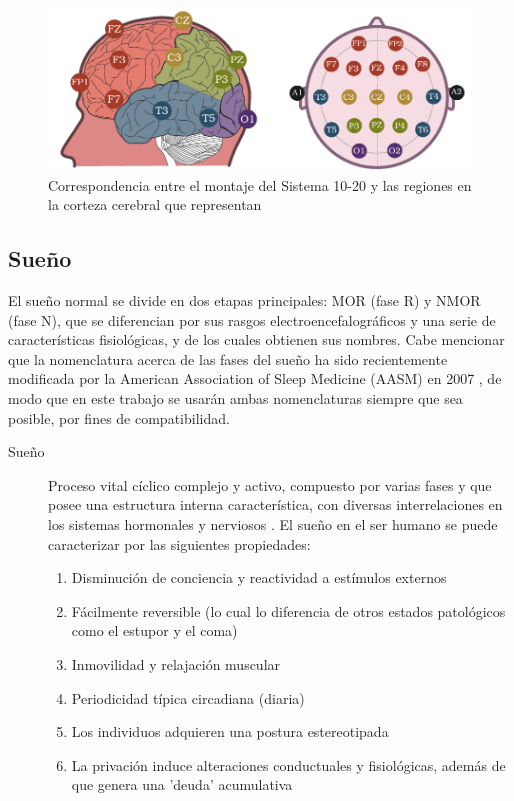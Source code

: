 \begin{figure}
\centering
\includegraphics[width=\linewidth]{./img_diagramas/cerebro_1020_v2.pdf} 
\caption{Correspondencia entre el montaje del Sistema 10-20 y las regiones en la corteza cerebral 
que representan
}
\label{corresponde_1020}
\end{figure}


\subsection{Sueño}

El sue\~no normal se divide en dos etapas principales: MOR (fase R) y NMOR (fase N), que se 
diferencian por sus rasgos electroencefalogr\'aficos y una serie de caracter\'isticas 
fisiol\'ogicas, y de los cuales obtienen sus nombres.
Cabe mencionar que la nomenclatura acerca de las fases del sue\~no ha sido recientemente modificada 
por la American Association of Sleep Medicine (AASM) en 2007 \cite{AASM07}, de modo que en este 
trabajo se  usar\'an ambas nomenclaturas siempre que sea posible, por fines de compatibilidad.

\begin{description}
\item[Sue\~no] Proceso vital c\'iclico complejo y activo, compuesto por varias fases y que posee 
una estructura interna caracter\'istica, con diversas interrelaciones en los sistemas hormonales y 
nerviosos \cite{FernandezConde07}.
El sue\~no en el ser humano se puede caracterizar por las siguientes 
propiedades\cite{CarrilloMora}:
\begin{enumerate}
\item Disminuci\'on de conciencia y reactividad a est\'imulos externos
\item F\'acilmente reversible (lo cual lo diferencia de otros estados 
patol\'ogicos como el estupor y el coma)
\item Inmovilidad y relajaci\'on muscular
\item Periodicidad t\'ipica circadiana (diaria)
\item Los individuos adquieren una postura estereotipada
\item La privaci\'on induce alteraciones conductuales y 
fisiol\'ogicas, adem\'as de que genera una 'deuda' acumulativa
\end{enumerate}
\end{description}

